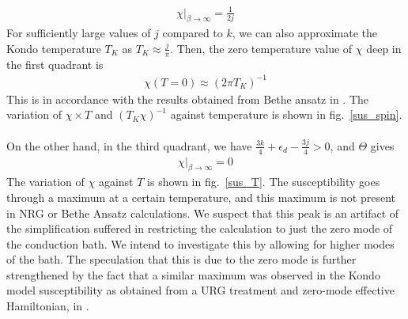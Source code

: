 \documentclass[twoside]{report}
\numberwithin{equation}{section}
\begin{document}
\begin{equation}\begin{aligned}
	\chi\vert_{\beta \to \infty} = \frac{1}{2j}
\end{aligned}\end{equation}
For sufficiently large values of \(j\) compared to \(k\), we can also approximate the Kondo temperature \(T_K\) as \(T_K \approx \frac{j}{\pi}\). Then, the zero temperature value of \(\chi\) deep in the first quadrant is
\begin{equation}\begin{aligned}
	\chi(T = 0) \approx \left(2 \pi T_K\right)^{-1}
\end{aligned}\end{equation}
This is in accordance with the results obtained from Bethe ansatz in \cite{okiji_kawakami}. The variation of \(\chi \times T\) and \(\left(T_K \chi\right)^{-1}\) against temperature is shown in fig.~\ref{sus_spin}.
\\\\On the other hand, in the third quadrant, we have \(\frac{3k}{4} + \epsilon_d - \frac{3j}{4} > 0\), and \(\Theta\) gives
\begin{equation}\begin{aligned}
	\chi\vert_{\beta \to \infty} = 0
\end{aligned}\end{equation}
The variation of \(\chi\) against \(T\) is shown in fig.~\ref{sus_T}. The susceptibility goes through a maximum at a certain temperature, and this maximum is not present in NRG or Bethe Ansatz calculations. We suspect that this peak is an artifact of the simplification suffered in restricting the calculation to just the zero mode of the conduction bath. We intend to investigate this by allowing for higher modes of the bath. The speculation that this is due to the zero mode is further strengthened by the fact that a similar maximum was observed in the Kondo model susceptibility as obtained from a URG treatment and zero-mode effective Hamiltonian, in \cite{am_thesis}.
\end{document}
